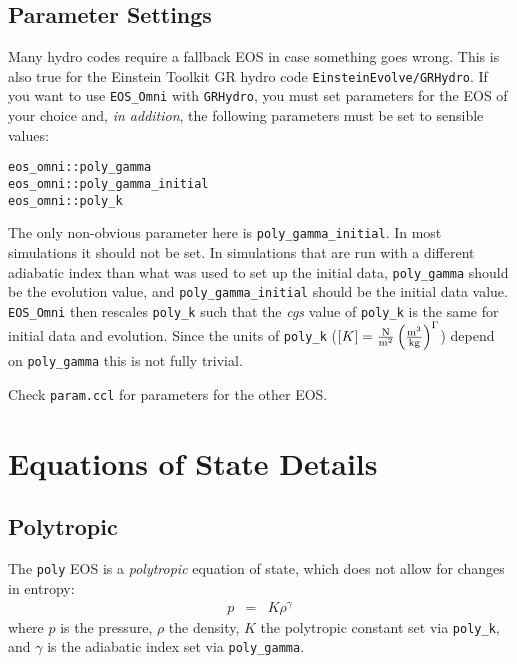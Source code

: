 \subsection{Parameter Settings}

Many hydro codes require a fallback EOS in case something goes
wrong. This is also true for the Einstein Toolkit GR hydro code
\texttt{EinsteinEvolve/GRHydro}. If you want to use \texttt{EOS\_Omni} with
\texttt{GRHydro}, you must set parameters for the EOS of your choice and,
\emph{in addition}, the following parameters must be set to sensible values:

\begin{verbatim}
eos_omni::poly_gamma 
eos_omni::poly_gamma_initial
eos_omni::poly_k 
\end{verbatim}

The only non-obvious parameter here is \texttt{poly\_gamma\_initial}.
In most simulations it should not be set.
In simulations that are run with a different adiabatic index than
what was used to set up the initial data, \texttt{poly\_gamma} should
be the evolution value, and \texttt{poly\_gamma\_initial} should be the
initial data value. \texttt{EOS\_Omni} then rescales \texttt{poly\_k} such
that the \emph{cgs} value of \texttt{poly\_k} is the same for initial data and
evolution. Since the units of \texttt{poly\_k}
($[K] = \frac{\rm N}{\rm m^2} \left(\frac{\rm m^3}{\rm kg}\right)^{\Gamma}$)
depend on \texttt{poly\_gamma} this is not fully trivial.

Check \texttt{param.ccl} for parameters for the other EOS\@.



\section{Equations of State Details}

\subsection{Polytropic}

The \texttt{poly} EOS is a \emph{polytropic} equation of state, which
does not allow for changes in entropy:
\begin{eqnarray}
  p & = & K \rho^\gamma
\end{eqnarray}
where $p$ is the pressure, $\rho$ the density, $K$ the polytropic
constant set via \texttt{poly\_k}, and $\gamma$ is the adiabatic index
set via \texttt{poly\_gamma}.

